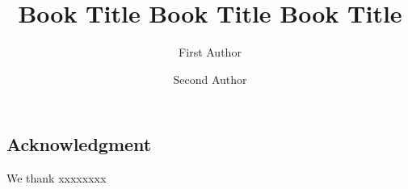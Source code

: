 
\begin{frontpage}

\title{Book Title Book Title Book Title}

\maketitle


\author{First Author}
\address{,
,
}


\author{Second Author}
\address{,
,
}
\end{frontpage}





\begin{frontchapter}
\begin{frontmatter}
\chapter*{\contentsname}
\makechaptertitle
\end{frontmatter}

%

\tableofcontents

\end{frontchapter}




\begin{frontchapter}

\begin{frontmatter}
\chapter*{Acknowledgment}
\makechaptertitle
\end{frontmatter}
We thank xxxxxxxx


\end{frontchapter}

 

